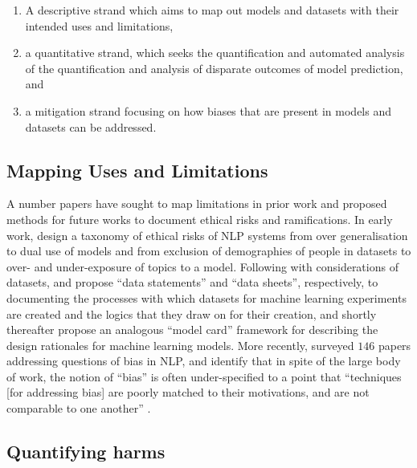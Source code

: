 \begin{enumerate}
  \item{A descriptive strand which aims to map out models and datasets with their intended uses and limitations,}
  \item{a quantitative strand, which seeks the quantification and automated analysis of the quantification and analysis of disparate outcomes of model prediction, and}
  \item{a mitigation strand focusing on how biases that are present in models and datasets can be addressed.}
\end{enumerate}

\subsection{Mapping Uses and Limitations}

A number papers have sought to map limitations in prior work and proposed methods for future works to document ethical risks and ramifications.
In early work, \citet{Hovy-Spruit:2016} design a taxonomy of ethical risks of NLP systems from over generalisation to dual use of models and from exclusion of demographies of people in datasets to over- and under-exposure of topics to a model.
Following with considerations of datasets, \citet{Bender-Friedman:2018} and \citet{Gebru:2018} propose ``data statements'' and ``data sheets'', respectively, to documenting the processes with which datasets for machine learning experiments are created and the logics that they draw on for their creation, and shortly thereafter \citet{Mitchell:2019} propose an analogous ``model card'' framework for describing the design rationales for machine learning models.
More recently, \citet{Blodgett:2020} surveyed $146$ papers addressing questions of bias in NLP, and identify that in spite of the large body of work, the notion of ``bias'' is often under-specified to a point that ``techniques [for addressing bias] are poorly matched to their motivations, and are not comparable to one another'' \citep[p. 5455]{Blodgett:2020}.

\subsection{Quantifying harms}

